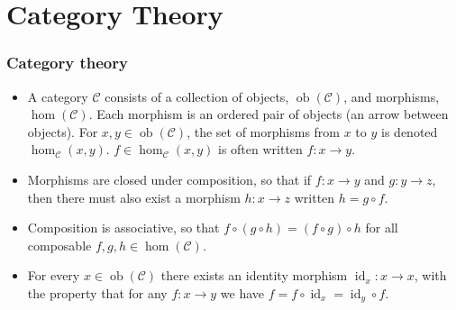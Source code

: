 \documentclass[mathserif,handout]{beamer}
\begin{document}
\section{Category Theory}

\begin{frame}[fragile]
  \frametitle{Category theory}
  \begin{itemize}
  \item A category $\mathcal{C}$ consists of a collection of \alert{objects}, $\operatorname{ob}(\mathcal{C})$, and \alert{morphisms}, $\operatorname{hom}(\mathcal{C})$. Each morphism is an ordered pair of objects (an arrow between objects). For $x,y\in \operatorname{ob}(\mathcal{C})$, the set of morphisms from $x$ to $y$ is denoted $\operatorname{hom}_{\mathcal{C}}(x,y)$. $f\in \operatorname{hom}_{\mathcal{C}}(x,y)$ is often written $f: x \longrightarrow y$.
  \item Morphisms are closed under \alert{composition}, so that if $f: x\longrightarrow y$ and $g: y\longrightarrow z$, then there must also exist a morphism $h: x\longrightarrow z$ written $h=g \circ f$.
  \item Composition is associative, so that $f\circ(g\circ h) = (f\circ g)\circ h$ for all composable $f, g, h\in \operatorname{hom}(\mathcal{C})$.
    \item For every $x\in \operatorname{ob}(\mathcal{C})$ there exists an \alert{identity} morphism $\operatorname{id}_x: x\longrightarrow x$, with the property that for any $f: x\longrightarrow y$ we have $f = f\circ \operatorname{id}_x = \operatorname{id}_y\circ f$.
  \end{itemize}
\end{frame}
\end{document}
